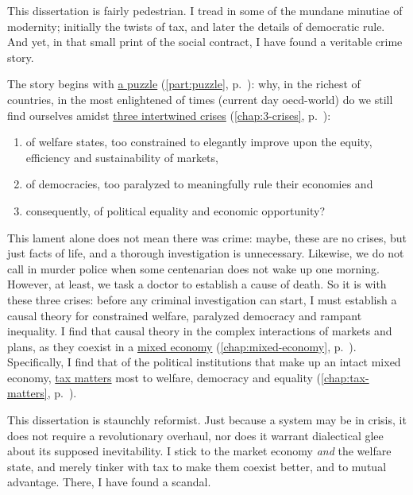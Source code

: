 


This dissertation is fairly pedestrian.
I tread in some of the mundane minutiae of modernity;
initially the twists of tax, and later the details of democratic rule.
And yet, in that small print of the social contract, I have found a veritable crime story.

The story begins with \hyperref[part:puzzle]{a puzzle} (\autoref{part:puzzle}, p.~\pageref{part:puzzle}):
why, in the richest of countries, in the most enlightened of times (current day \gls{oecd}-world) do we still find ourselves amidst \hyperref[chap:3-crises]{three intertwined crises} (\autoref{chap:3-crises}, p.~\pageref{chap:3-crises}):

\begin{enumerate}
	\item of welfare states, too constrained to elegantly improve upon the equity, efficiency and sustainability of markets,
	\item of democracies, too paralyzed to meaningfully rule their economies and
	\item consequently, of political equality and economic opportunity?
\end{enumerate}

This lament alone does not mean there was crime:
maybe, these are no crises, but just facts of life, and a thorough investigation is unnecessary.
Likewise, we do not call in murder police when some centenarian does not wake up one morning.
However, at least, we task a doctor to establish a cause of death.
So it is with these three crises:
before any criminal investigation can start, I must establish a causal theory for constrained welfare, paralyzed democracy and rampant inequality.
I find that causal theory in the complex interactions of markets and plans, as they coexist in a \hyperref[chap:mixed-economy]{mixed economy} (\autoref{chap:mixed-economy}, p.~\pageref{chap:mixed-economy}).
Specifically, I find that of the political institutions that make up an intact mixed economy, \hyperref[chap:tax-matters]{tax matters} most to welfare, democracy and equality (\autoref{chap:tax-matters}, p.~\pageref{chap:tax-matters}).

This dissertation is staunchly reformist.
Just because a system may be in crisis, it does not require a revolutionary overhaul, nor does it warrant dialectical glee about its supposed inevitability.
I stick to the market economy \emph{and} the welfare state, and merely tinker with tax to make them coexist better, and to mutual advantage.
There, I have found a scandal.

